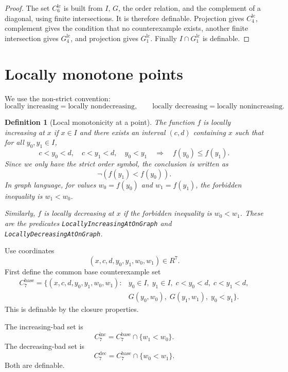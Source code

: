 \documentclass[11pt]{article}
\newtheorem{definition}{Definition}[section]
\begin{document}
\begin{proof}
The set $C^{\mathrm{lc}}_6$ is built from $I$, $G$, the order relation, and the complement of a diagonal, using finite intersections. It is therefore definable. Projection gives $C^{\mathrm{lc}}_4$, complement gives the condition that no counterexample exists, another finite intersection gives $G^{\mathrm{lc}}_4$, and projection gives $G^{\mathrm{lc}}_1$. Finally $I\cap G^{\mathrm{lc}}_1$ is definable.
\end{proof}

\section{Locally monotone points}

We use the non-strict convention:
\[
  \text{locally increasing} = \text{locally nondecreasing},
  \qquad
  \text{locally decreasing} = \text{locally nonincreasing}.
\]

\begin{definition}[Local monotonicity at a point]
The function $f$ is locally increasing at $x$ if $x\in I$ and there exists an interval $(c,d)$ containing $x$ such that for all $y_0,y_1\in I$,
\[
  c<y_0<d,
  \quad c<y_1<d,
  \quad y_0<y_1
  \quad\Longrightarrow\quad
  f(y_0)\le f(y_1).
\]
Since we only have the strict order symbol, the conclusion is written as
\[
  \neg(f(y_1)<f(y_0)).
\]
In graph language, for values $w_0=f(y_0)$ and $w_1=f(y_1)$, the forbidden inequality is $w_1<w_0$.

Similarly, $f$ is locally decreasing at $x$ if the forbidden inequality is $w_0<w_1$.
These are the predicates \texttt{LocallyIncreasingAtOnGraph} and \texttt{LocallyDecreasingAtOnGraph}.
\end{definition}

Use coordinates
\[
  (x,c,d,y_0,y_1,w_0,w_1)
  \in R^7.
\]
First define the common base counterexample set
\[
\begin{aligned}
  C^{\mathrm{base}}_7=\{(x,c,d,y_0,y_1,w_0,w_1):{}&
  y_0\in I,
  \;y_1\in I,
  \;c<y_0<d,
  \;c<y_1<d,\\
  &G(y_0,w_0),
  \;G(y_1,w_1),
  \;y_0<y_1\}.
\end{aligned}
\]
This is definable by the closure properties.

The increasing-bad set is
\[
  C^{\mathrm{inc}}_7
  =C^{\mathrm{base}}_7\cap\{w_1<w_0\}.
\]
The decreasing-bad set is
\[
  C^{\mathrm{dec}}_7
  =C^{\mathrm{base}}_7\cap\{w_0<w_1\}.
\]
Both are definable.
\end{document}
